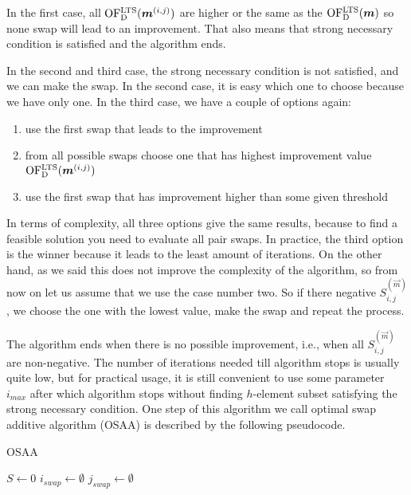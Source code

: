 In the first case, all $\operatorname{OF^{LTS}_D}(\boldsymbol{m}^{(i,j)})$ are higher or the same as the $\operatorname{OF^{LTS}_D}(\boldsymbol{m})$ so none swap will lead to an improvement. That also means that strong necessary condition is satisfied and the algorithm ends.

In the second and third case, the strong necessary condition is not satisfied, and we can make the swap. In the second case, it is easy which one to choose because we have only one. In the third case, we have a couple of options again:
\begin{enumerate}
    \item use the first swap that leads to the improvement
    \item from all possible swaps choose one that has highest improvement value  $\operatorname{OF^{LTS}_D}(\boldsymbol{m}^{(i,j)})$
    \item use the first swap that has improvement higher than some given threshold
\end{enumerate}

In terms of complexity, all three options give the same results, because to find a feasible solution you need to evaluate all pair swaps. In practice, the third option is the winner because it leads to the least amount of iterations. On the other hand, as we said this does not improve the complexity of the algorithm, so from now on let us assume that we use the case number two.
So if there negative  $S^{(\vec{m})}_{i,j}$, we choose the one with the lowest value, make the swap and repeat the process.  

The algorithm ends when there is no possible improvement, i.e., when all $S^{(\vec{m})}_{i,j}$ are non-negative.
The number of iterations needed till algorithm stops is usually quite low, but for practical usage, it is still convenient to use some parameter $i_{max}$ after which algorithm stops without finding $h$-element subset satisfying the strong necessary condition. 
One step of this algorithm we call optimal swap additive algorithm (OSAA) is described by the following pseudocode.

\begin{algorithm}[H]
    \label{alg:optimal:improvement}
    \caption{OSAA}
    
    $S \gets 0$\;
    $i_{swap} \gets \emptyset$\;
    $j_{swap} \gets \emptyset$\;

    \;
\end{algorithm}



